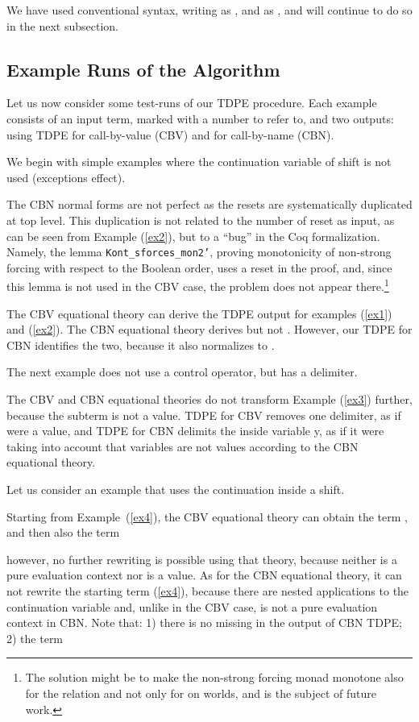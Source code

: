 \documentclass{eptcs}
\theoremstyle{definition}
\theoremstyle{plain}
\theoremstyle{remark}
\begin{document}
We have used conventional syntax, writing  as , and  as , and will continue to do so in the next subsection.

\subsection{Example Runs of the Algorithm}\label{examples}

Let us now consider some test-runs of our TDPE procedure. Each example consists of an input term, marked with a number to refer to, and two outputs: using TDPE for call-by-value (CBV) and for call-by-name (CBN).

We begin with simple examples where the continuation variable of shift is not used (exceptions effect).


The CBN normal forms are not perfect as the resets are systematically duplicated at top level. This duplication is not related to the number of reset as input, as can be seen from Example (\ref{ex2}), but to a ``bug'' in the Coq formalization. Namely, the lemma \texttt{Kont\_sforces\_mon2'}, proving monotonicity of non-strong forcing with respect to the Boolean order, uses a reset in the proof, and, since this lemma is not used in the CBV case, the problem does not appear there.\footnote{The solution might be to make the non-strong forcing monad monotone also for the  relation and not only for  on worlds, and is the subject of future work.}

The CBV equational theory can derive the TDPE output for examples (\ref{ex1}) and (\ref{ex2}). The CBN equational theory derives  but not . However, our TDPE for CBN identifies the two, because it also normalizes  to .

The next example does not use a control operator, but has a delimiter.

The CBV and CBN equational theories do not transform Example (\ref{ex3}) further, because the subterm  is not a value. TDPE for CBV removes one delimiter, as if  were a value, and TDPE for CBN delimits the inside variable y, as if it were taking into account that variables are not values according to the CBN equational theory.

Let us consider an example that uses the continuation inside a shift.

Starting from Example~(\ref{ex4}), the CBV equational theory can obtain the term
,
and then also the term

however, no further rewriting is possible using that theory, because neither is  a pure evaluation context nor is  a value. As for the CBN equational theory, it can not rewrite the starting term (\ref{ex4}), because there are nested applications to the continuation variable  and, unlike in the CBV case,  is not a pure evaluation context in CBN. Note that: 1) there is no  missing in the output of CBN TDPE; 2) the term
\end{document}
